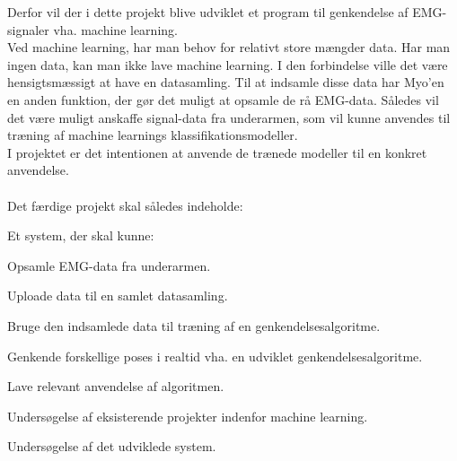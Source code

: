 Derfor vil der i dette projekt blive udviklet et program til genkendelse af EMG-signaler vha. machine learning. \\
Ved machine learning, har man behov for relativt store mængder data. Har man ingen data, kan man ikke lave machine learning. I den forbindelse ville det være hensigtsmæssigt at have en datasamling. Til at indsamle disse data har Myo'en en anden funktion, der gør det muligt at opsamle de rå EMG-data. Således vil det være muligt anskaffe signal-data fra underarmen, som vil kunne anvendes til træning af machine learnings klassifikationsmodeller. \\
I projektet er det intentionen at anvende de trænede modeller til en konkret anvendelse. \\\\
Det færdige projekt skal således indeholde:
\begin{myItemize}
\item Et system, der skal kunne:
	\begin{myItemize}
		\item Opsamle EMG-data fra underarmen.
		\item Uploade data til en samlet datasamling.
		\item Bruge den indsamlede data til træning af en genkendelsesalgoritme.
		\item Genkende forskellige poses i realtid vha. en udviklet genkendelsesalgoritme.
		\item Lave relevant anvendelse af algoritmen.
	\end{myItemize}
\item Undersøgelse af eksisterende projekter indenfor machine learning.
\item Undersøgelse af det udviklede system.
\end{myItemize}

